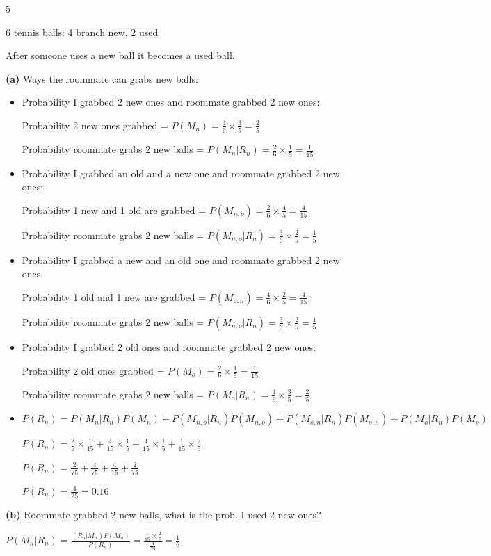 \documentclass[12 pt]{article}
\begin{document}
    \begin{exercise}{5}
    \hfill

    6 tennis balls: 4 branch new, 2 used
    
    After someone uses a new ball it becomes a used ball.

    \textbf{(a)} Ways the roommate can grabs new balls:
    \begin{itemize}
        \item Probability I grabbed 2 new ones and roommate grabbed 2 new ones: 

        Probability 2 new ones grabbed = $P(M_n) = \frac{4}{6} \times \frac{3}{5} = \frac{2}{5}$

        Probability roommate grabs 2 new balls = $P(M_n | R_n) = \frac{2}{6} \times \frac{1}{5} = \frac{1}{15}$

        \item Probability I grabbed an old and a new one and roommate grabbed 2 new ones:

        Probability 1 new and 1 old are grabbed = $P(M_{n,o}) = \frac{2}{6} \times \frac{4}{5} = \frac{4}{15}$

        Probability roommate grabs 2 new balls = $P(M_{n,o} | R_n) = \frac{3}{6} \times \frac{2}{5} = \frac{1}{5}$

        \item Probability I grabbed a new and an old one and roommate grabbed 2 new ones

        Probability 1 old and 1 new are grabbed = $P(M_{o,n}) = \frac{4}{6} \times \frac{2}{5} = \frac{4}{15}$

        Probability roommate grabs 2 new balls = $P(M_{n,o} | R_n) = \frac{3}{6} \times \frac{2}{5} = \frac{1}{5}$

        \item Probability I grabbed 2 old ones and roommate grabbed 2 new ones:

        Probability 2 old ones grabbed = $P(M_o) = \frac{2}{6} \times \frac{1}{5} = \frac{1}{15}$

        Probability roommate grabs 2 new balls = $P(M_o | R_n) = \frac{4}{6} \times \frac{3}{5} = \frac{2}{5}$

        \item $P(R_n) = P(M_n | R_n) P(M_n) + P(M_{n,o} | R_n) P(M_{n,o}) + P(M_{o,n} | R_n) P(M_{o,n}) + P(M_o | R_n) P(M_o)$

        $P(R_n) = \frac{2}{5} \times \frac{1}{15} + \frac{4}{15} \times \frac{1}{5} + \frac{4}{15} \times \frac{1}{5} + \frac{1}{15} \times \frac{2}{5}$

        $P(R_n) = \frac{2}{75} + \frac{4}{75} + \frac{4}{75} + \frac{2}{75}$

        $P(R_n) = \frac{4}{25} = 0.16$
    \end{itemize}

    \hfill

    \textbf{(b)} Roommate grabbed 2 new balls, what is the prob. I used 2 new ones?

    $P(M_n | R_n) = \frac{(R_n | M_n) P(M_n)}{P(R_n)} = \frac{\frac{1}{15} \times \frac{2}{5}}{\frac{4}{25}} = \frac{1}{6}$
    \end{exercise}
\end{document}
